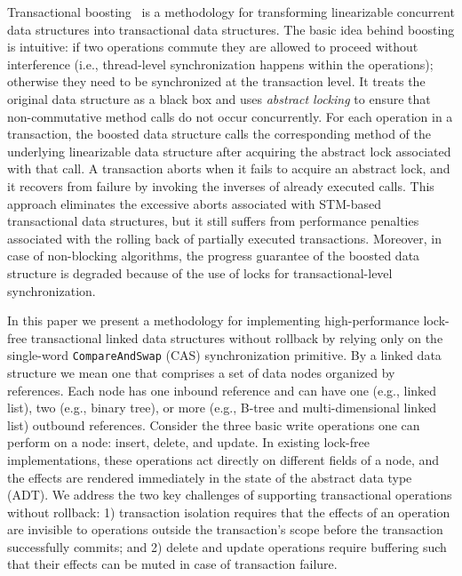 \documentclass[10pt,conference,compsocconf]{IEEEtran}
\begin{document}
Transactional boosting~\cite{herlihy2008transactional} is a methodology for transforming linearizable concurrent data structures into transactional data structures.
The basic idea behind boosting is intuitive: if two operations commute they are allowed to proceed without interference (i.e., thread-level synchronization happens within the operations); otherwise they need to be synchronized at the transaction level.
It treats the original data structure as a black box and uses \emph{abstract locking} to ensure that non-commutative method calls do not occur concurrently. 
For each operation in a transaction, the boosted data structure calls the corresponding method of the underlying linearizable data structure after acquiring the abstract lock associated with that call. 
A transaction aborts when it fails to acquire an abstract lock, and it recovers from failure by invoking the inverses of already executed calls. 
This approach eliminates the excessive aborts associated with STM-based transactional data structures, but it still suffers from performance penalties associated with the rolling back of partially executed transactions.
Moreover, in case of non-blocking algorithms, the progress guarantee of the boosted data structure is degraded because of the use of locks for transactional-level synchronization.
 
In this paper we present a methodology for implementing high-performance lock-free transactional linked data structures without rollback by relying only on the single-word \texttt{CompareAndSwap} (CAS) synchronization primitive.
By a linked data structure we mean one that comprises a set of data nodes organized by references. 
Each node has one inbound reference and can have one (e.g., linked list), two (e.g., binary tree), or more (e.g., B-tree and multi-dimensional linked list) outbound references.
Consider the three basic write operations one can perform on a node: insert, delete, and update.
In existing lock-free implementations, these operations act directly on different fields of a node, and the effects are rendered immediately in the state of the abstract data type (ADT).
We address the two key challenges of supporting transactional operations without rollback: 1) transaction isolation requires that the effects of an operation are invisible to operations outside the transaction's scope before the transaction successfully commits; and 2) delete and update operations require buffering such that their effects can be muted in case of transaction failure.
\end{document}
